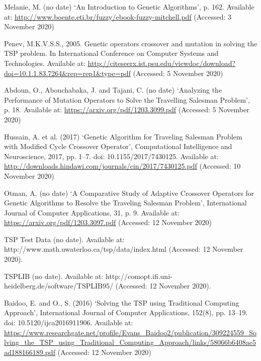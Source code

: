 \documentclass[11pt,a4paper,titlepage]{article}
\begin{document}
\begin{thebibliography}{1}
Melanie, M. (no date) ‘An Introduction to Genetic Algorithms’, p. 162. Available at: \url {http://www.boente.eti.br/fuzzy/ebook-fuzzy-mitchell.pdf} (Accessed: 3 November 2020)

Penev, M.K.V.S.S., 2005. Genetic operators crossover and mutation in solving the TSP problem. In International Conference on Computer Systems and Technologies. Available at: \url{http://citeseerx.ist.psu.edu/viewdoc/download?doi=10.1.1.83.7264&rep=rep1&type=pdf} (Accessed: 5 November 2020)

Abdoun, O., Abouchabaka, J. and Tajani, C. (no date) ‘Analyzing the Performance of Mutation Operators to Solve the Travelling Salesman Problem’, p. 18. Available at: \url{https://arxiv.org/pdf/1203.3099.pdf} (Accessed: 5 November 2020)

Hussain, A. et al. (2017) ‘Genetic Algorithm for Traveling Salesman Problem with Modified Cycle Crossover Operator’, Computational Intelligence and Neuroscience, 2017, pp. 1–7. doi: 10.1155/2017/7430125. Available at: \url{http://downloads.hindawi.com/journals/cin/2017/7430125.pdf} (Accessed: 10 November 2020)

Otman, A. (no date) ‘A Comparative Study of Adaptive Crossover Operators for Genetic Algorithms to Resolve the Traveling Salesman Problem’, International Journal of Computer Applications, 31, p. 9.
Available at: \url{https://arxiv.org/pdf/1203.3097.pdf} (Accessed: 12 November 2020)

TSP Test Data (no date). Available at: http://www.math.uwaterloo.ca/tsp/data/index.html (Accessed: 12 November 2020).

TSPLIB (no date). Available at: http://comopt.ifi.uni-heidelberg.de/software/TSPLIB95/ (Accessed: 12 November 2020).

Baidoo, E. and O., S. (2016) ‘Solving the TSP using Traditional Computing Approach’, International Journal of Computer Applications, 152(8), pp. 13–19. doi: 10.5120/ijca2016911906. Available at: \url{https://www.researchgate.net/profile/Evans_Baidoo2/publication/309224559_Solving_the_TSP_using_Traditional_Computing_Approach/links/58066b6408ae5ad188166189.pdf} (Accessed: 12 November 2020)



\end{thebibliography}

\begin{appendices}
\end{appendices}
\end{document}
